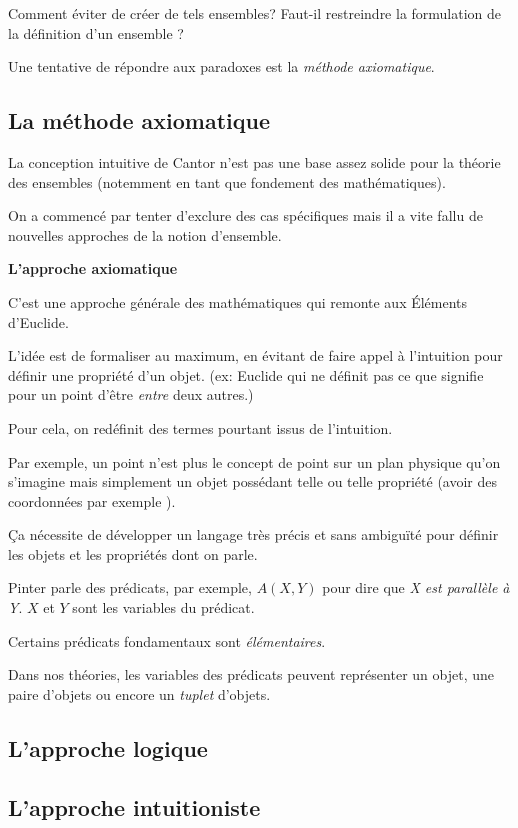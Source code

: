 \documentclass[fleqn,a4paper,nobib]{tufte-handout}
\begin{document}
Comment éviter de créer de tels ensembles? Faut-il restreindre la
formulation de la définition d'un ensemble ? 

Une tentative de répondre aux paradoxes est la \textit{méthode axiomatique}.

\subsection{La méthode axiomatique}

La conception intuitive de Cantor n'est pas une base assez solide
pour la théorie des ensembles (notemment en tant que fondement des
mathématiques).

On a commencé par tenter d'exclure des cas spécifiques
 mais il a
vite fallu de nouvelles approches de la notion d'ensemble.

\textbf{L'approche axiomatique}

C'est une approche générale des mathématiques qui remonte aux
Éléments d'Euclide.

L'idée est de formaliser au maximum, en évitant de faire appel à
l'intuition pour définir une propriété d'un objet. (ex: Euclide
qui ne définit pas ce que signifie pour un point d'être \textit{entre}
deux autres.)

Pour cela, on redéfinit des termes pourtant issus de l'intuition.

Par exemple, un point n'est plus le concept de point sur un plan
physique qu'on s'imagine mais simplement un objet possédant telle
ou telle propriété (avoir des coordonnées par exemple
).

Ça nécessite de développer un langage très précis et sans
ambiguïté pour définir les objets et les propriétés dont on parle.

Pinter parle des prédicats, par exemple, $A(X, Y)$ pour dire
que \textit{X est parallèle à Y}. $X$ et $Y$ sont les
variables du prédicat. 

Certains prédicats fondamentaux sont \textit{élémentaires}.

Dans nos théories, les variables des prédicats peuvent représenter
un objet, une paire d'objets ou encore un \textit{tuplet}
 d'objets.

\subsection{L'approche logique}

\subsection{L'approche intuitioniste}
\end{document}

